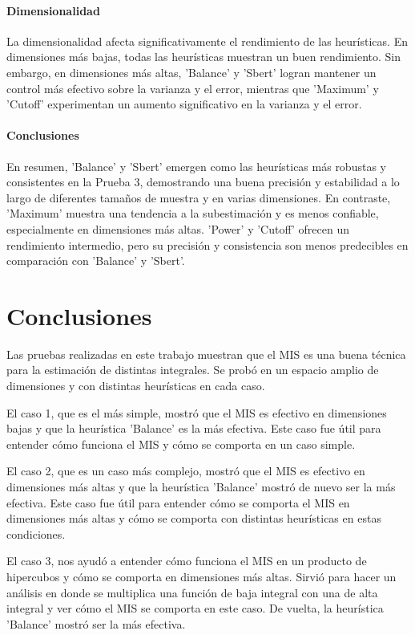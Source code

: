 \documentclass{article}
\begin{document}
\paragraph{Dimensionalidad}
La dimensionalidad afecta significativamente el rendimiento de las heurísticas. En dimensiones más bajas, todas las heurísticas muestran un buen rendimiento. Sin embargo, en dimensiones más altas, 'Balance' y 'Sbert' logran mantener un control más efectivo sobre la varianza y el error, mientras que 'Maximum' y 'Cutoff' experimentan un aumento significativo en la varianza y el error.

\paragraph{Conclusiones}
En resumen, 'Balance' y 'Sbert' emergen como las heurísticas más robustas y consistentes en la Prueba 3, demostrando una buena precisión y estabilidad a lo largo de diferentes tamaños de muestra y en varias dimensiones. En contraste, 'Maximum' muestra una tendencia a la subestimación y es menos confiable, especialmente en dimensiones más altas. 'Power' y 'Cutoff' ofrecen un rendimiento intermedio, pero su precisión y consistencia son menos predecibles en comparación con 'Balance' y 'Sbert'.

\section{Conclusiones}

Las pruebas realizadas en este trabajo muestran que el MIS es una buena técnica para la estimación de distintas integrales.
Se probó en un espacio amplio de dimensiones y con distintas heurísticas en cada caso.

El caso 1, que es el más simple, mostró que el MIS es efectivo en dimensiones bajas y que la heurística 'Balance' es la más efectiva.
Este caso fue útil para entender cómo funciona el MIS y cómo se comporta en un caso simple.

El caso 2, que es un caso más complejo, mostró que el MIS es efectivo en dimensiones más altas y que la heurística 'Balance' mostró de nuevo ser la más efectiva.
Este caso fue útil para entender cómo se comporta el MIS en dimensiones más altas y cómo se comporta con distintas heurísticas en estas condiciones.

El caso 3, nos ayudó a entender cómo funciona el MIS en un producto de hipercubos y cómo se comporta en dimensiones más altas.
Sirvió para hacer un análisis en donde se multiplica una función de baja integral con una de alta integral y ver cómo el MIS se comporta en este caso.
De vuelta, la heurística 'Balance' mostró ser la más efectiva.
\end{document}
